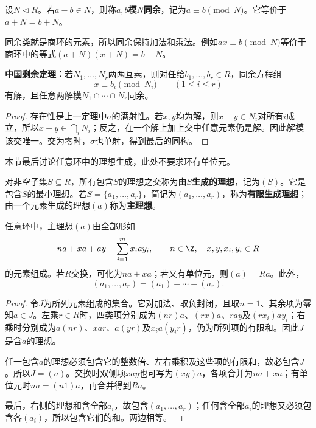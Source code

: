 \begin{definition}
设$N\lhd R$。若$a-b\in N$，则称$a,b$\textbf{模$N$同余}，记为$a\equiv b\pmod N$。它等价于$a+N=b+N$。
\end{definition}

同余类就是商环的元素，所以同余保持加法和乘法。例如$ax\equiv b\pmod N$等价于商环中的等式$(a+N)(x+N)=b+N$。

\begin{corollary}\label{p2:ring-crt-congruence}
\textbf{中国剩余定理：}若$N_1,\ldots,N_r$两两互素，则对任给$b_1,\ldots,b_r\in R$，同余方程组
\[
x\equiv b_i\pmod{N_i}\qquad(1\leq i\leq r)
\]
有解，且任意两解模$N_1\cap\cdots\cap N_r$同余。

\end{corollary}
\begin{proof}
存在性是上一定理中$\sigma$的满射性。若$x,y$均为解，则$x-y\in N_i$对所有$i$成立，所以$x-y\in\bigcap_iN_i$；反之，在一个解上加上交中任意元素仍是解。因此解模该交唯一。交为零时，$\sigma$也单射，得到最后的同构。
\end{proof}


本节最后讨论任意环中的理想生成，此处不要求环有单位元。

\begin{definition}
对非空子集$S\subseteq R$，所有包含$S$的理想之交称为\textbf{由$S$生成的理想}，记为$(S)$。它是包含$S$的最小理想。若$S=\{a_1,\ldots,a_r\}$，简记为$(a_1,\ldots,a_r)$，称为\textbf{有限生成理想}；由一个元素生成的理想$(a)$称为\textbf{主理想}。
\end{definition}

\begin{proposition}
任意环中，主理想$(a)$由全部形如
\[
na+xa+ay+\sum_{i=1}^m x_iay_i,
\qquad n\in\Z,\quad x,y,x_i,y_i\in R
\]
的元素组成。若$R$交换，可化为$na+xa$；若又有单位元，则$(a)=Ra$。此外，
\[
(a_1,\ldots,a_r)=(a_1)+\cdots+(a_r).
\]
\end{proposition}
\begin{proof}
令$J$为所列元素组成的集合。它对加法、取负封闭，且取$n=1$、其余项为零知$a\in J$。左乘$r\in R$时，四类项分别成为$(nr)a$、$(rx)a$、$ray$及$(rx_i)ay_i$；右乘时分别成为$a(nr)$、$xar$、$a(yr)$及$x_i a(y_ir)$，仍为所列项的有限和。因此$J$是含$a$的理想。

任一包含$a$的理想必须包含它的整数倍、左右乘积及这些项的有限和，故必包含$J$。所以$J=(a)$。交换时双侧项$xay$也可写为$(xy)a$，各项合并为$na+xa$；有单位元时$na=(n1)a$，再合并得到$Ra$。

最后，右侧的理想和含全部$a_i$，故包含$(a_1,\ldots,a_r)$；任何含全部$a_i$的理想又必须包含各$(a_i)$，所以包含它们的和。两边相等。
\end{proof}


